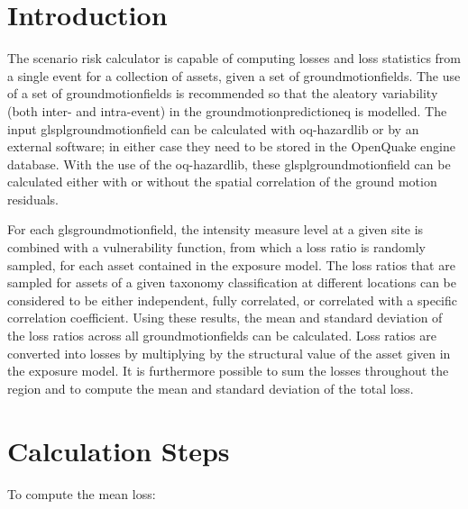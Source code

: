 

\section{Introduction}
The scenario risk calculator is capable of computing losses and loss statistics from a single event for a collection of assets, given a set of \glspl{groundmotionfield}. The use of a set of \glspl{groundmotionfield} is recommended so that the aleatory variability (both inter- and intra-event) in the \gls{groundmotionpredictioneq} is modelled. The input glspl{groundmotionfield} can be calculated with oq-hazardlib or by an external software; in either case they need to be stored in the OpenQuake engine database. With the use of the oq-hazardlib, these glspl{groundmotionfield} can be calculated either with or without the spatial correlation of the ground motion residuals.

For each gls{groundmotionfield}, the intensity measure level at a given site is combined with a \gls{vulnerability function}, from which a loss ratio is randomly sampled, for each \gls{asset} contained in the \gls{exposure model}. The loss ratios that are sampled for \glspl{asset} of a given \gls{taxonomy} classification at different locations can be considered to be either independent, fully correlated, or correlated with a specific correlation coefficient. Using these results, the mean and standard deviation of the loss ratios across all \glspl{groundmotionfield} can be calculated. Loss ratios are converted into losses by multiplying by the structural value of the \gls{asset} given in the exposure model. It is furthermore possible to sum the losses throughout the region and to compute the mean and standard deviation of the total loss. 

\section{Calculation Steps}

To compute the mean loss:

